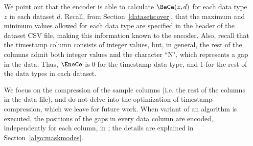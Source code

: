 We point out that the encoder is able to calculate $\BeCe(z, d)$ for each data type $z$ in each dataset $d$. Recall, from Section~\ref{datasets:over}, that the maximum and minimum values allowed for each data type are specified in the header of the dataset CSV file, making this information known to the encoder. Also, recall that the timestamp column consists of integer values, but, in general, the rest of the columns admit both integer values and the character ``N", which represents a gap in the data. Thus, $\EneCe$ is 0 for the timestamp data type, and 1 for the rest of the data types in each dataset.


\newcommand{\gapLine}{6}
We focus on the compression of the sample columns (i.e. the rest of the columns in the data file), and do not delve into the optimization of timestamp compression, which we leave for future work. When variant \maskalgo of an algorithm is executed, the positions of the gaps in every data column are encoded, independently for each column, in \Line \gapLine; the details are explained in Section~\ref{algo:maskmodes}.

